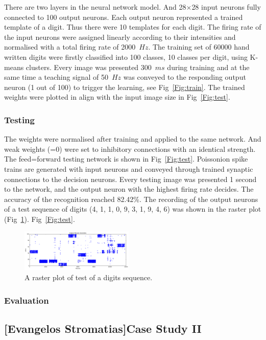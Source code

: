 There are two layers in the neural network model.
And 28$\times$28 input neurons fully connected to 100 output neurons.
Each output neuron represented a trained template of a digit.
Thus there were 10 templates for each digit.
The firing rate of the input neurons were assigned linearly according to their intensities and normalised with a total firing rate of 2000~$Hz$.
The training set of 60000 hand written digits were firstly classified into 100 classes, 10 classes per digit, using K-means clusters.
Every image was presented 300~$ms$ during training and at the same time a teaching signal of 50~$Hz$ was conveyed to the responding output neuron (1 out of 100) to trigger the learning, see Fig~\ref{Fig:train}.
The trained weights were plotted in align with the input image size in Fig~\ref{Fig:test}.



\subsubsection{Testing}
The weights were normalised after training and applied to the same network.
And weak weights (=0) were set to inhibitory connections with an identical strength.
The feed=forward testing network is shown in Fig~\ref{Fig:test}.
Poissonion spike trains are generated with input neurons and conveyed through trained synaptic connections to the decision neurons.
Every testing image was presented 1 second to the network, and the output neuron with the highest firing rate decides.
The accuracy of the recognition reached 82.42\%.%
The recording of the output neurons of a test sequence of digits (4, 1, 1, 0, 9, 3, 1, 9, 4, 6) was shown in the raster plot (Fig~\ref{Fig:output}).
Fig~\ref{Fig:test}.

\begin{figure}[hbt!]
	\centering
	\includegraphics[width=0.48\textwidth]{images/test300-301.pdf}
	\caption{A raster plot of test of a digits sequence.}
	\label{Fig:output}
\end{figure} 
\subsubsection{Evaluation}

\subsection{[Evangelos Stromatias]Case Study II}
